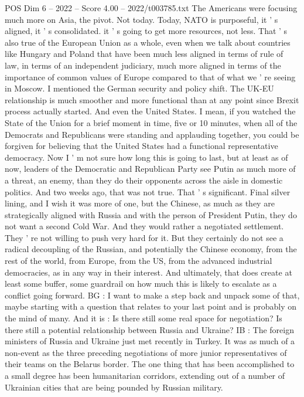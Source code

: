 \begin{textsample}{POS Dim 6 – 2022 – Score 4.00 – 2022/t003785.txt}
The Americans were focusing much more on Asia, the pivot.
Not today.
Today, NATO is purposeful, it ' s aligned, it ' s consolidated. it ' s going to get more resources, not less.
That ' s also true of the European Union as a whole, even when we talk about countries like Hungary and Poland that have been much less aligned in terms of rule of law, in terms of an independent judiciary, much more aligned in terms of the importance of common values of Europe compared to that of what we ' re seeing in Moscow.
I mentioned the German security and policy shift.
The UK-EU relationship is much smoother and more functional than at any point since Brexit process actually started.
And even the United States.
I mean, if you watched the State of the Union for a brief moment in time, five or 10 minutes, when all of the Democrats and Republicans were standing and applauding together, you could be forgiven for believing that the United States had a functional representative democracy.
Now I ' m not sure how long this is going to last, but at least as of now, leaders of the Democratic and Republican Party see Putin as much more of a threat, an enemy, than they do their opponents across the aisle in domestic politics.
And two weeks ago, that was not true.
That ' s significant.
Final silver lining, and I wish it was more of one, but the Chinese, as much as they are strategically aligned with Russia and with the person of President Putin, they do not want a second Cold War.
And they would rather a negotiated settlement.
They ' re not willing to push very hard for it.
But they certainly do not see a radical decoupling of the Russian, and potentially the Chinese economy, from the rest of the world, from Europe, from the US, from the advanced industrial democracies, as in any way in their interest.
And ultimately, that does create at least some buffer, some guardrail on how much this is likely to escalate as a conflict going forward.
BG : I want to make a step back and unpack some of that, maybe starting with a question that relates to your last point and is probably on the mind of many.
And it is : Is there still some real space for negotiation?
Is there still a potential relationship between Russia and Ukraine?
IB : The foreign ministers of Russia and Ukraine just met recently in Turkey.
It was as much of a non-event as the three preceding negotiations of more junior representatives of their teams on the Belarus border.
The one thing that has been accomplished to a small degree has been humanitarian corridors, extending out of a number of Ukrainian cities that are being pounded by Russian military.

\end{textsample}
